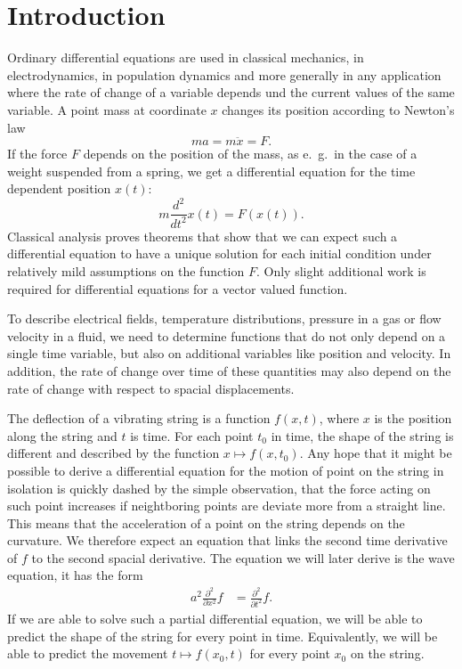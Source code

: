 %
%
%
\chapter*{Introduction}
Ordinary differential equations are used in classical mechanics,
in electrodynamics, in population dynamics and more generally in any
application where the rate of change of a variable depends und the current
values of the same variable.
A point mass at coordinate $x$ changes its position according to 
Newton's law
\[
ma=m\ddot x=F.
\]
If the force $F$ depends on the position of the mass, as e.~g.~in the
case of a weight suspended from a spring, we get a differential equation
for the time dependent position $x(t)$:
\[
m\frac{d^2}{dt^2}x(t)=F(x(t)).
\]
Classical analysis proves theorems that show that we can expect such
a differential equation to have a unique solution for each
initial condition under relatively mild assumptions on the function $F$.
Only slight additional work is required for differential equations 
for a vector valued function.

To describe electrical fields, temperature distributions, pressure
in a gas or flow velocity in a fluid, we need to determine functions 
that do not only depend on a single time variable, but also on additional
variables like position and velocity.
In addition, the rate of change over time of these quantities may also depend
on the rate of change with respect to spacial displacements.

The deflection of a vibrating string is a function $f(x,t)$, where $x$ is
the position along the string and $t$ is time.
For each point $t_0$ in time, the shape of the string is different and
described by the function $x\mapsto f(x,t_0)$.
Any hope that it might be possible to derive a differential equation
for the motion of point on the string in isolation is quickly dashed
by the simple observation, that the force acting on such point
increases if neightboring points are deviate more from a straight line.
This means that the acceleration of a point on the string depends on 
the curvature.
We therefore expect an equation that links the second time derivative of $f$
to the second spacial derivative.
The equation we will later derive is the wave equation, it has the form
\begin{align*}
a^2\frac{\partial^2}{\partial x^2}f&= \frac{\partial^2}{\partial t^2}f.
\end{align*}
If we are able to solve such a partial differential equation,
we will be able to predict the shape of the string for every point in
time.
Equivalently, we will be able to predict the movement $t\mapsto f(x_0,t)$
for every point $x_0$ on the string.


